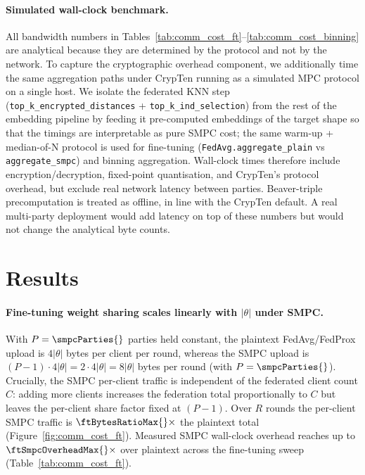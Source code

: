 \documentclass{article}
\begin{document}
\paragraph{Simulated wall-clock benchmark.} All bandwidth numbers in
Tables~\ref{tab:comm_cost_ft}--\ref{tab:comm_cost_binning} are analytical because they are determined
by the protocol and not by the network. To capture the cryptographic
overhead component, we additionally time the same aggregation paths
under CrypTen running as a simulated MPC protocol on a single host. We
isolate the federated KNN step
(\texttt{top\_k\_encrypted\_distances} + \texttt{top\_k\_ind\_selection})
from the rest of the embedding pipeline by feeding it pre-computed
embeddings of the target shape so that the timings are interpretable
as pure SMPC cost; the same warm-up + median-of-N protocol is used
for fine-tuning (\texttt{FedAvg.aggregate\_plain} vs
\texttt{aggregate\_smpc}) and binning aggregation. Wall-clock times
therefore include encryption/decryption, fixed-point quantisation, and
CrypTen's protocol overhead, but exclude real network latency between
parties. Beaver-triple precomputation is treated as offline, in line
with the CrypTen default. A real multi-party deployment would add
latency on top of these numbers but would not change the analytical
byte counts.

\section*{Results}



\paragraph{Fine-tuning weight sharing scales linearly with $|\theta|$
under SMPC.} With $P=\smpcParties{}$ parties held constant, the
plaintext FedAvg/FedProx upload is $4|\theta|$ bytes per client per
round, whereas the SMPC upload is $(P-1)\cdot 4|\theta|=2\cdot 4|\theta|=8|\theta|$
bytes per round (with $P=\smpcParties{}$). Crucially, the SMPC per-client traffic is independent
of the federated client count $C$: adding more clients increases the
federation total proportionally to $C$ but leaves the per-client
share factor fixed at $(P-1)$. Over $R$ rounds the per-client SMPC
traffic is $\ftBytesRatioMax{}\times$ the plaintext total
(Figure~\ref{fig:comm_cost_ft}). Measured SMPC wall-clock overhead
reaches up to $\ftSmpcOverheadMax{}\times$ over plaintext across the
fine-tuning sweep (Table~\ref{tab:comm_cost_ft}).
\end{document}
